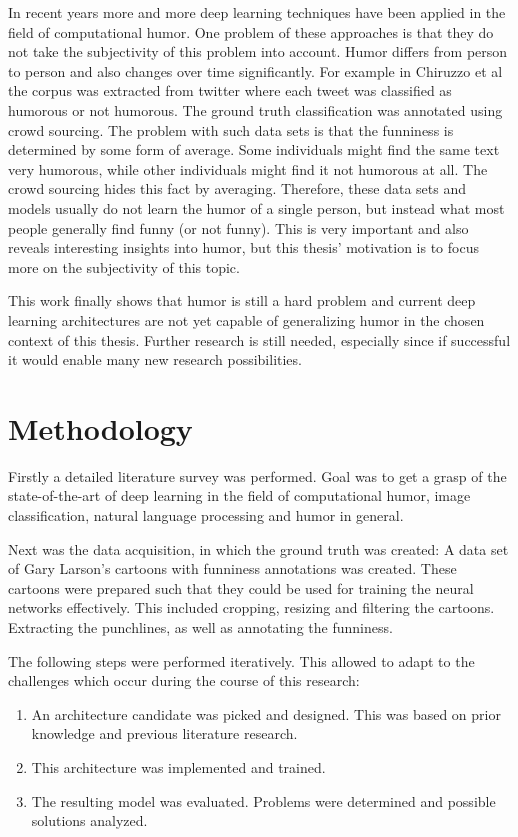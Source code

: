 \documentclass[draft,final,oneside]{vutinfth} %
\begin{document}
In recent years more and more deep learning techniques have been applied in the field of computational humor. One problem of these approaches is that they do not take the subjectivity of this problem into account. Humor differs from person to person and also changes over time significantly. For example in Chiruzzo et al \cite{chiruzzo2019overview} the corpus was extracted from twitter where each tweet was classified as humorous or not humorous. The ground truth classification was annotated using crowd sourcing. The problem with such data sets is that the funniness is determined by some form of average. Some individuals might find the same text very humorous, while other individuals might find it not humorous at all. The crowd sourcing hides this fact by averaging. Therefore, these data sets and models usually do not learn the humor of a single person, but instead what most people generally find funny (or not funny). This is very important and also reveals interesting insights into humor, but this thesis' motivation is to focus more on the subjectivity of this topic.

This work finally shows that humor is still a hard problem and current deep learning architectures are not yet capable of generalizing humor in the chosen context of this thesis. Further research is still needed, especially since if successful it would enable many new research possibilities.


\section{Methodology}

Firstly a detailed literature survey was performed. Goal was to get a grasp of the state-of-the-art of deep learning in the field of computational humor, image classification, natural language processing and humor in general.

Next was the data acquisition, in which the ground truth was created: A data set of Gary Larson's cartoons with funniness annotations was created. These cartoons were prepared such that they could be used for training the neural networks effectively. This included cropping, resizing and filtering the cartoons. Extracting the punchlines, as well as annotating the funniness.

The following steps were performed iteratively. This allowed to adapt to the challenges which occur during the course of this research:

\begin{enumerate}

\item An architecture candidate was picked and designed. This was based on prior knowledge and previous literature research.
\item This architecture was implemented and trained.
\item The resulting model was evaluated. Problems were determined and possible solutions analyzed.

\end{enumerate}
\end{document}
